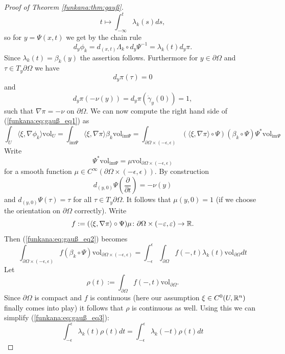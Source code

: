 \begin{proof}[Proof of Theorem \ref{funkana:thm:gauß}]
    \[
    t \mapsto \int_{-\infty}^t\lambda_k(s) ds,
    \]
    so for $y = \Psi(x,t)$ we get by the chain rule 
    \[
    d_y\phi_k = d_{(x,t)} \Lambda_k \circ d_y\Psi^{-1} = \lambda_k(t) d_y\pi.
    \]
    Since $\lambda_k(t) = \beta_k(y)$ the assertion follows. Furthermore for $y \in \partial\Omega$ and $\tau \in T_y\partial\Omega$ we have 
    \[
    d_y\pi(\tau) = 0
    \] 
    and 
    \[
    d_y\pi(-\nu(y)) = d_y\pi(\dot{\gamma}_y(0)) = 1,
    \]
    such that $\nabla \pi = - \nu$ on $\partial \Omega$. We can now compute the right hand side of (\ref{funkana:eq:gauß_eq1}) as
    \begin{equation}
        \label{funkana:eq:gauß_eq2}
        \int_U\langle\xi ,\nabla\phi_k\rangle \mathrm{vol}_U = \int_{\mathrm{im}\Psi} \langle \xi,\nabla\pi \rangle \beta_k \mathrm{vol}_{\mathrm{im}\Psi} = \int_{\partial \Omega \times (-\epsilon,\epsilon)} (\langle \xi,\nabla \pi \rangle \circ \Psi) (\beta_k \circ \Psi) \Psi^\ast\mathrm{vol}_{\mathrm{im}\Psi}
    \end{equation}
    Write $$\Psi^\ast\mathrm{vol}_{\mathrm{im}\Psi} = \mu \mathrm{vol}_{\partial \Omega \times (-\epsilon,\epsilon)}$$ for a smooth function $\mu \in C^\infty(\partial \Omega \times (-\epsilon,\epsilon))$. By construction 
    \[
    d_{(y,0)}\Psi \left(\frac{\partial}{\partial t}\right) = -\nu(y)
    \]
    and $d_{(y,0)}\Psi(\tau) = \tau$ for all $\tau \in T_y\partial \Omega$. It follows that $\mu(y,0) = 1$ (if we choose the orientation on $\partial \Omega$ correctly). \needspace{3em}
    \noindent Write 
    \[
    f := (\langle \xi,\nabla \pi \rangle \circ \Psi)\mu \colon \partial \Omega \times (-\varepsilon,\varepsilon) \to \mathbb{R}.
    \]
    Then (\ref{funkana:eq:gauß_eq2}) becomes 
    \begin{equation}
        \label{funkana:eq:gauß_eq3}
        \int_{\partial \Omega \times (-\epsilon,\epsilon)} f (\beta_k \circ \Psi) \mathrm{vol}_{\partial \Omega \times (-\epsilon,\epsilon)} = \int_{-\epsilon}^{\epsilon}\int_{\partial\Omega}f(-,t)\lambda_k(t) \mathrm{vol}_{\partial \Omega} dt
    \end{equation}
    Let 
    \[
    \rho(t) := \int_{\partial\Omega}f(-,t) \mathrm{vol}_{\partial \Omega}.
    \]
    Since $\partial \Omega$ is compact and $f$ is continuous (here our assumption $\xi \in C^0(U,\mathbb{R}^n)$ finally comes into play) it follows that $\rho$ is continuous as well. Using this we can simplify (\ref{funkana:eq:gauß_eq3}):
    \begin{equation}
        \label{funkana:eq:gauß_eq4}
        \int_{-\epsilon}^{\epsilon} \lambda_k(t)\rho(t) dt = \int_{-\epsilon}^{\epsilon} \lambda_k(-t)\rho(t) dt

\end{equation}
\end{proof}
